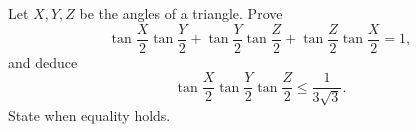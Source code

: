 Let $X,Y,Z$ be the angles of a triangle. Prove
\[\tan\dfrac{X}{2}\tan\dfrac{Y}{2}+\tan\dfrac{Y}{2}\tan\dfrac{Z}{2}+\tan\dfrac{Z}{2}\tan\dfrac{X}{2}=1,\]
and deduce
\[\tan\dfrac{X}{2}\tan\dfrac{Y}{2}\tan\dfrac{Z}{2}\le\dfrac{1}{3\sqrt3}.\]
State when equality holds.
